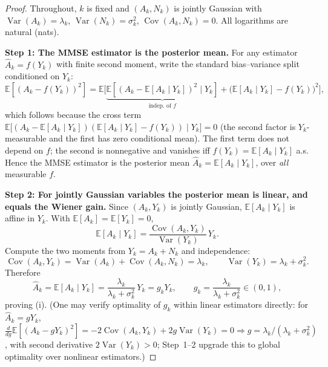 \begin{proof}
Throughout, $k$ is fixed and $(A_k,N_k)$ is jointly Gaussian with $\operatorname{Var}(A_k)=\lambda_k$, $\operatorname{Var}(N_k)=\sigma_k^2$, $\operatorname{Cov}(A_k,N_k)=0$. All logarithms are natural (nats).

\medskip
\noindent\textbf{Step 1: The MMSE estimator is the posterior mean.}
For any estimator $\hat A_k=f(Y_k)$ with finite second moment, write the standard bias--variance split conditioned on $Y_k$:
\[
\mathbb{E}\!\left[(A_k-f(Y_k))^2\right]
=\mathbb{E}\Big[\underbrace{\mathbb{E}\!\left[(A_k-\mathbb{E}[A_k\mid Y_k])^2\mid Y_k\right]}_{\text{indep.\ of }f}
+\big(\mathbb{E}[A_k\mid Y_k]-f(Y_k)\big)^2\Big],
\]
which follows because the cross term
$\mathbb{E}\!\big[(A_k-\mathbb{E}[A_k\mid Y_k])(\mathbb{E}[A_k\mid Y_k]-f(Y_k))\mid Y_k\big]=0$
(the second factor is $Y_k$-measurable and the first has zero conditional mean). The first term does not depend on $f$; the second is nonnegative and vanishes iff $f(Y_k)=\mathbb{E}[A_k\mid Y_k]$ a.s. Hence the MMSE estimator is the posterior mean $\hat A_k=\mathbb{E}[A_k\mid Y_k]$, over \emph{all} measurable $f$.

\medskip
\noindent\textbf{Step 2: For jointly Gaussian variables the posterior mean is linear, and equals the Wiener gain.}
Since $(A_k,Y_k)$ is jointly Gaussian, $\mathbb{E}[A_k\mid Y_k]$ is affine in $Y_k$. With $\mathbb{E}[A_k]=\mathbb{E}[Y_k]=0$,
\[
\mathbb{E}[A_k\mid Y_k]=\frac{\operatorname{Cov}(A_k,Y_k)}{\operatorname{Var}(Y_k)}\,Y_k .
\]
Compute the two moments from $Y_k=A_k+N_k$ and independence:
\[
\operatorname{Cov}(A_k,Y_k)=\operatorname{Var}(A_k)+\operatorname{Cov}(A_k,N_k)=\lambda_k,
\qquad
\operatorname{Var}(Y_k)=\lambda_k+\sigma_k^2 .
\]
Therefore
\[
\hat A_k=\mathbb{E}[A_k\mid Y_k]=\frac{\lambda_k}{\lambda_k+\sigma_k^2}\,Y_k=g_kY_k,
\qquad g_k=\frac{\lambda_k}{\lambda_k+\sigma_k^2}\in(0,1),
\]
proving (i). (One may verify optimality of $g_k$ within linear estimators directly: for $\hat A_k=gY_k$, $\tfrac{d}{dg}\mathbb{E}[(A_k-gY_k)^2]=-2\operatorname{Cov}(A_k,Y_k)+2g\operatorname{Var}(Y_k)=0\Rightarrow g=\lambda_k/(\lambda_k+\sigma_k^2)$, with second derivative $2\operatorname{Var}(Y_k)>0$; Step~1--2 upgrade this to global optimality over nonlinear estimators.)


\end{proof}
